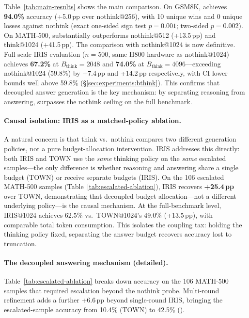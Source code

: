 Table~\ref{tab:main-results} shows the main comparison.
On GSM8K, \method{} achieves \textbf{94.0\%} accuracy (+5.0\,pp over nothink@256),
with 10 unique wins and 0 unique losses against nothink (exact one-sided sign test $p{=}0.001$; two-sided $p{=}0.002$).
On MATH-500, \method{} substantially outperforms nothink@512 (+13.5\,pp) and think@1024 (+41.5\,pp).
The comparison with nothink@1024 is now definitive.
Full-scale IRIS evaluation ($n{=}500$, same H800 hardware as nothink@1024) achieves \textbf{67.2\%}  at $B_{\text{think}}{=}2048$ and \textbf{74.0\%}  at $B_{\text{think}}{=}4096$---exceeding nothink@1024 (59.8\%) by +7.4\,pp and +14.2\,pp respectively, with CI lower bounds well above 59.8\% (\S\ref{sec:experiments:bthink}).
This confirms that decoupled answer generation is the key mechanism: by separating reasoning from answering, \method{} surpasses the nothink ceiling on the full benchmark.

\paragraph{Causal isolation: IRIS as a matched-policy ablation.}
A natural concern is that think vs.\ nothink compares two different generation policies, not a pure budget-allocation intervention.
IRIS addresses this directly: both IRIS and TOWN use the \emph{same} thinking policy on the \emph{same} escalated samples---the only difference is whether reasoning and answering share a single budget (TOWN) or receive separate budgets (IRIS).
On the 106 escalated MATH-500 samples (Table~\ref{tab:escalated-ablation}), IRIS recovers \textbf{+25.4\,pp} over TOWN, demonstrating that decoupled budget allocation---not a different underlying policy---is the causal mechanism.
At the full-benchmark level, IRIS@1024 achieves 62.5\% vs.\ TOWN@1024's 49.0\% (+13.5\,pp), with comparable total token consumption.
This isolates the coupling tax: holding the thinking policy fixed, separating the answer budget recovers accuracy lost to truncation.

\paragraph{The decoupled answering mechanism (detailed).}
Table~\ref{tab:escalated-ablation} breaks down accuracy on the 106 MATH-500 samples that required escalation beyond the nothink probe.
Multi-round refinement adds a further +6.6\,pp beyond single-round IRIS, bringing the escalated-sample accuracy from 10.4\% (TOWN) to 42.5\% (\method{}).

